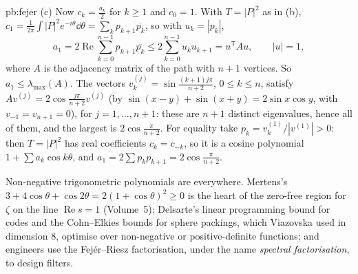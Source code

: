 \begin{solution}{pb:fejer}
(c) Now $c_k=\frac{a_k}2$ for $k\ge1$ and $c_0=1$. With $T=|P|^2$ as in (b), $c_1=\frac1{2\pi}\int|P|^2e^{-i\theta}\dd\theta=\sum_kp_{k+1}\overline{p_k}$, so with $u_k=|p_k|$,
\[
a_1=2\operatorname{Re}\sum_{k=0}^{n-1}p_{k+1}\overline{p_k}\le2\sum_{k=0}^{n-1}u_ku_{k+1}=u^{\mathsf T}Au,\qquad|u|=1,
\]
where $A$ is the adjacency matrix of the path with $n+1$ vertices. So $a_1\le\lambda_{\max}(A)$. The vectors $v^{(j)}_k=\sin\frac{(k+1)j\pi}{n+2}$, $0\le k\le n$, satisfy
$Av^{(j)}=2\cos\frac{j\pi}{n+2}v^{(j)}$ (by $\sin(x-y)+\sin(x+y)=2\sin x\cos y$, with $v_{-1}=v_{n+1}=0$), for $j=1,\dots,n+1$: these are $n+1$ distinct eigenvalues,
hence all of them, and the largest is $2\cos\frac\pi{n+2}$. For equality take $p_k=v^{(1)}_k/|v^{(1)}|>0$: then $T=|P|^2$ has real coefficients $c_k=c_{-k}$, so it is
a cosine polynomial $1+\sum a_k\cos k\theta$, and $a_1=2\sum p_kp_{k+1}=2\cos\frac\pi{n+2}$.

\leads Non-negative trigonometric polynomials are everywhere. Mertens's $3+4\cos\theta+\cos2\theta=2(1+\cos\theta)^2\ge0$ is the heart of the zero-free
region for $\zeta$ on the line $\operatorname{Re}s=1$ (Volume~5); Delsarte's linear programming bound for codes and the Cohn--Elkies bounds for sphere packings,
which Viazovska used in dimension $8$, optimise over non-negative or positive-definite functions; and engineers use the Fejér--Riesz
factorisation, under the name \emph{spectral factorisation}, to design filters.
\end{solution}

